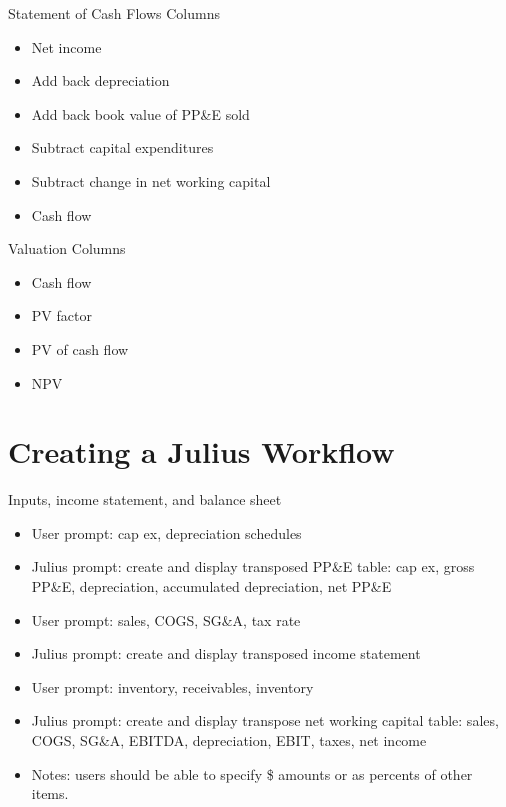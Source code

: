 \documentclass[10pt]{beamer}
\begin{document}
\begin{frame}{Statement of Cash Flows Columns}
    \begin{itemize}
        \item Net income
        \item Add back depreciation
        \item Add back book value of PP\&E sold
        \item Subtract capital expenditures
        \item Subtract change in net working capital
        \item Cash flow
    \end{itemize}
\end{frame}

\begin{frame}{Valuation Columns}
    \begin{itemize}
        \item Cash flow
        \item PV factor
        \item PV of cash flow
        \item NPV
    \end{itemize}
\end{frame}


\section{Creating a Julius Workflow}

\begin{frame}{Inputs, income statement, and balance sheet}
    \begin{itemize}
        \item User prompt: cap ex, depreciation schedules
        \item Julius prompt: create and display transposed PP\&E table: cap ex, gross PP\&E, depreciation, accumulated depreciation, net PP\&E
        \item User prompt: sales, COGS, SG\&A, tax rate 
        \item Julius prompt: create and display transposed income statement
        \item User prompt: inventory, receivables, inventory 
        \item Julius prompt: create and display transpose net working capital table: sales, COGS, SG\&A, EBITDA, depreciation, EBIT, taxes, net income
        \item Notes: users should be able to specify \$ amounts or as percents of other items.
    \end{itemize}
\end{frame}
\end{document}
